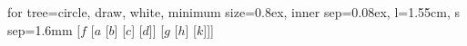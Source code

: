 \begin{center}
	\begin{forest} for tree={circle, draw, white, minimum size=0.8ex, inner sep=0.08ex,%
	   l=1.55cm, s sep=1.6mm}
		[$f$ [$a$ [$b$] [$c$] [$d$]] [$g$ [$h$] [$k$]]]
	\end{forest}
\end{center}
